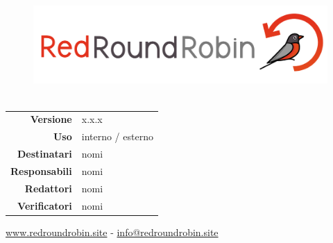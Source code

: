 
\begin{figure}[t!]
    \centering
    \includegraphics[height=11em]{res/images/logo.png}
\end{figure}

\maketitle 
\thispagestyle{empty}


\begin{table}[ht]
  \begin{center}
    \label{tab:Informazioni_Documento}
    \begin{tabular}{r|l}
    	\textbf{Versione} &  x.x.x \\
		\textbf{Uso} &  interno / esterno \\
		\textbf{Destinatari} &  nomi \\
		\textbf{Responsabili} &  nomi \\
		\textbf{Redattori} &  nomi \\
		\textbf{Verificatori} &  nomi\\
    \end{tabular}
  \end{center}
\end{table}


\begin{center}
	\vspace{9em}
    \hr
    \href{https://www.redroundrobin.site}{www.redroundrobin.site} - \href{mailto:info@redroundrobin.site}{info@redroundrobin.site}
\end{center}

